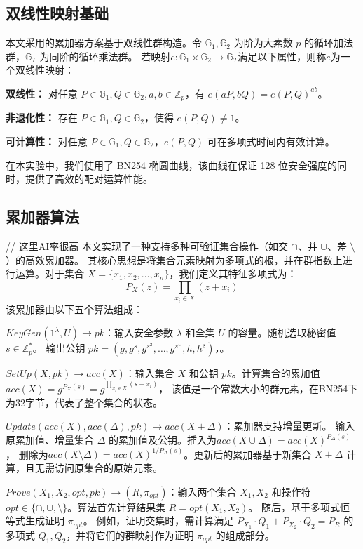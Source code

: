\subsection{双线性映射基础}
本文采用的累加器方案基于双线性群构造。令 $\mathbb{G}_1, \mathbb{G}_2$ 为阶为大素数 $p$ 的循环加法群，$\mathbb{G}_T$ 为同阶的循环乘法群。
若映射$e: \mathbb{G}_1 \times \mathbb{G}_2 \to \mathbb{G}_T$满足以下属性，则称$e$为一个双线性映射：

\quad \textbf{双线性：} 对任意 $P \in \mathbb{G}_1, Q \in \mathbb{G}_2, a, b \in \mathbb{Z}_p$，有 $e(aP, bQ) = e(P, Q)^{ab}$。

\quad \textbf{非退化性：} 存在 $P \in \mathbb{G}_1, Q \in \mathbb{G}_2$，使得 $e(P, Q) \neq 1$。

\quad \textbf{可计算性：} 对任意 $P \in \mathbb{G}_1, Q \in \mathbb{G}_2$，$e(P, Q)$ 可在多项式时间内有效计算。

在本实验中，我们使用了 BN254 椭圆曲线，该曲线在保证 128 位安全强度的同时，提供了高效的配对运算性能。
\subsection{累加器算法}
// 这里AI率很高
本文实现了一种支持多种可验证集合操作（如交 $\cap$、并 $\cup$、差 $\setminus$）的高效累加器。
其核心思想是将集合元素映射为多项式的根，并在群指数上进行运算。对于集合 $X = \{x_1, x_2, \dots, x_n\}$，我们定义其特征多项式为：
\begin{equation}
    P_X(z) = \prod_{x_i \in X} (z + x_i)
\end{equation}
该累加器由以下五个算法组成：

$KeyGen(1^\lambda, U) \rightarrow pk$：输入安全参数 $\lambda$ 和全集 $U$ 的容量。随机选取秘密值 $s \in \mathbb{Z}_p^*$。
输出公钥 $pk = (g, g^s, g^{s^2}, \dots, g^{s^U}, h, h^s)$，。

$SetUp(X, pk) \rightarrow acc(X)$：输入集合 $X$ 和公钥 $pk$。计算集合的累加值 $acc(X) = g^{P_X(s)} = g^{\prod_{x_i \in X} (s + x_i)}$，
该值是一个常数大小的群元素，在BN254下为32字节，代表了整个集合的状态。

$Update(acc(X), acc(\Delta), pk) \rightarrow acc(X \pm \Delta)$：累加器支持增量更新。
输入原累加值、增量集合 $\Delta$ 的累加值及公钥。插入为$acc(X \cup \Delta) = acc(X)^{P_\Delta(s)}$，
删除为$acc(X \setminus \Delta) = acc(X)^{1/P_\Delta(s)}$。更新后的累加器基于新集合 $X \pm \Delta$ 计算，且无需访问原集合的原始元素。

$Prove(X_1, X_2, opt, pk) \rightarrow (R, \pi_{opt})$：输入两个集合 $X_1, X_2$ 和操作符 $opt \in \{\cap, \cup, \setminus\}$。算法首先计算结果集 $R = opt(X_1, X_2)$。
随后，基于多项式恒等式生成证明 $\pi_{opt}$。
例如，证明交集时，需计算满足 $P_{X_1} \cdot Q_1 + P_{X_2} \cdot Q_2 = P_R$ 的多项式 $Q_1, Q_2$，并将它们的群映射作为证明 $\pi_{opt}$ 的组成部分。

